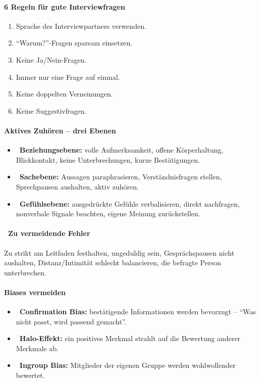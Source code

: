 \paragraph{6 Regeln für gute Interviewfragen}
\begin{enumerate}[nosep]
  \item Sprache des Interviewpartners verwenden.
  \item \enquote{Warum?}-Fragen sparsam einsetzen.
  \item Keine Ja/Nein-Fragen.
  \item Immer nur eine Frage auf einmal.
  \item Keine doppelten Verneinungen.
  \item Keine Suggestivfragen.
\end{enumerate}

\paragraph{Aktives Zuhören -- drei Ebenen}
\begin{itemize}[nosep]
  \item {}~\textbf{Beziehungsebene:} volle Aufmerksamkeit, offene Körperhaltung, Blickkontakt, keine Unterbrechungen, kurze Bestätigungen.
  \item {}~\textbf{Sachebene:} Aussagen paraphrasieren, Verständnisfragen stellen, Sprechpausen aushalten, aktiv zuhören.
  \item {}~\textbf{Gefühlsebene:} ausgedrückte Gefühle verbalisieren, direkt nachfragen, nonverbale Signale beachten, eigene Meinung zurückstellen.
\end{itemize}

\paragraph{~Zu vermeidende Fehler}
Zu strikt am Leitfaden festhalten, ungeduldig sein, Gesprächspausen nicht
aushalten, Distanz/Intimität schlecht balancieren, die befragte Person
unterbrechen.

\paragraph{Biases vermeiden}
\begin{itemize}[nosep]
  \item {}~\textbf{Confirmation Bias:} bestätigende Informationen werden bevorzugt -- \enquote{Was nicht passt, wird passend gemacht}.
  \item {}~\textbf{Halo-Effekt:} ein positives Merkmal strahlt auf die Bewertung anderer Merkmale ab.
  \item {}~\textbf{Ingroup Bias:} Mitglieder der eigenen Gruppe werden wohlwollender bewertet.
\end{itemize}

